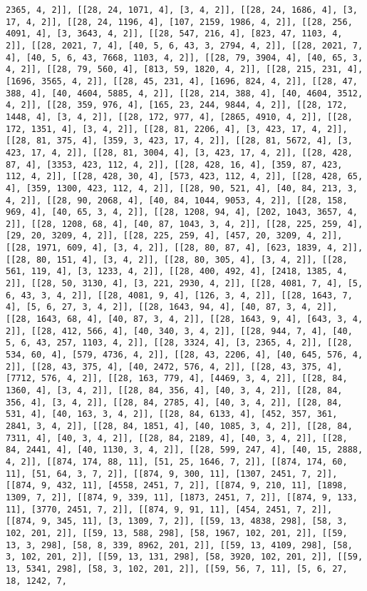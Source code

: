 \documentclass[12pt,fleqn]{article}\usepackage{../../common}
\begin{document}
\begin{verbatim}
2365, 4, 2]], [[28, 24, 1071, 4], [3, 4, 2]], [[28, 24, 1686, 4], [3, 17, 4, 2]], [[28, 24, 1196, 4], [107, 2159, 1986, 4, 2]], [[28, 256, 4091, 4], [3, 3643, 4, 2]], [[28, 547, 216, 4], [823, 47, 1103, 4, 2]], [[28, 2021, 7, 4], [40, 5, 6, 43, 3, 2794, 4, 2]], [[28, 2021, 7, 4], [40, 5, 6, 43, 7668, 1103, 4, 2]], [[28, 79, 3904, 4], [40, 65, 3, 4, 2]], [[28, 79, 560, 4], [813, 59, 1820, 4, 2]], [[28, 215, 231, 4], [1696, 3565, 4, 2]], [[28, 45, 231, 4], [1696, 824, 4, 2]], [[28, 47, 388, 4], [40, 4604, 5885, 4, 2]], [[28, 214, 388, 4], [40, 4604, 3512, 4, 2]], [[28, 359, 976, 4], [165, 23, 244, 9844, 4, 2]], [[28, 172, 1448, 4], [3, 4, 2]], [[28, 172, 977, 4], [2865, 4910, 4, 2]], [[28, 172, 1351, 4], [3, 4, 2]], [[28, 81, 2206, 4], [3, 423, 17, 4, 2]], [[28, 81, 375, 4], [359, 3, 423, 17, 4, 2]], [[28, 81, 5672, 4], [3, 423, 17, 4, 2]], [[28, 81, 3004, 4], [3, 423, 17, 4, 2]], [[28, 428, 87, 4], [3353, 423, 112, 4, 2]], [[28, 428, 16, 4], [359, 87, 423, 112, 4, 2]], [[28, 428, 30, 4], [573, 423, 112, 4, 2]], [[28, 428, 65, 4], [359, 1300, 423, 112, 4, 2]], [[28, 90, 521, 4], [40, 84, 213, 3, 4, 2]], [[28, 90, 2068, 4], [40, 84, 1044, 9053, 4, 2]], [[28, 158, 969, 4], [40, 65, 3, 4, 2]], [[28, 1208, 94, 4], [202, 1043, 3657, 4, 2]], [[28, 1208, 68, 4], [40, 87, 1043, 3, 4, 2]], [[28, 225, 259, 4], [29, 20, 3209, 4, 2]], [[28, 225, 259, 4], [457, 20, 3209, 4, 2]], [[28, 1971, 609, 4], [3, 4, 2]], [[28, 80, 87, 4], [623, 1839, 4, 2]], [[28, 80, 151, 4], [3, 4, 2]], [[28, 80, 305, 4], [3, 4, 2]], [[28, 561, 119, 4], [3, 1233, 4, 2]], [[28, 400, 492, 4], [2418, 1385, 4, 2]], [[28, 50, 3130, 4], [3, 221, 2930, 4, 2]], [[28, 4081, 7, 4], [5, 6, 43, 3, 4, 2]], [[28, 4081, 9, 4], [126, 3, 4, 2]], [[28, 1643, 7, 4], [5, 6, 27, 3, 4, 2]], [[28, 1643, 94, 4], [40, 87, 3, 4, 2]], [[28, 1643, 68, 4], [40, 87, 3, 4, 2]], [[28, 1643, 9, 4], [643, 3, 4, 2]], [[28, 412, 566, 4], [40, 340, 3, 4, 2]], [[28, 944, 7, 4], [40, 5, 6, 43, 257, 1103, 4, 2]], [[28, 3324, 4], [3, 2365, 4, 2]], [[28, 534, 60, 4], [579, 4736, 4, 2]], [[28, 43, 2206, 4], [40, 645, 576, 4, 2]], [[28, 43, 375, 4], [40, 2472, 576, 4, 2]], [[28, 43, 375, 4], [7712, 576, 4, 2]], [[28, 163, 779, 4], [4469, 3, 4, 2]], [[28, 84, 1360, 4], [3, 4, 2]], [[28, 84, 356, 4], [40, 3, 4, 2]], [[28, 84, 356, 4], [3, 4, 2]], [[28, 84, 2785, 4], [40, 3, 4, 2]], [[28, 84, 531, 4], [40, 163, 3, 4, 2]], [[28, 84, 6133, 4], [452, 357, 361, 2841, 3, 4, 2]], [[28, 84, 1851, 4], [40, 1085, 3, 4, 2]], [[28, 84, 7311, 4], [40, 3, 4, 2]], [[28, 84, 2189, 4], [40, 3, 4, 2]], [[28, 84, 2441, 4], [40, 1130, 3, 4, 2]], [[28, 599, 247, 4], [40, 15, 2888, 4, 2]], [[874, 174, 88, 11], [51, 25, 1646, 7, 2]], [[874, 174, 60, 11], [51, 64, 3, 7, 2]], [[874, 9, 300, 11], [1307, 2451, 7, 2]], [[874, 9, 432, 11], [4558, 2451, 7, 2]], [[874, 9, 210, 11], [1898, 1309, 7, 2]], [[874, 9, 339, 11], [1873, 2451, 7, 2]], [[874, 9, 133, 11], [3770, 2451, 7, 2]], [[874, 9, 91, 11], [454, 2451, 7, 2]], [[874, 9, 345, 11], [3, 1309, 7, 2]], [[59, 13, 4838, 298], [58, 3, 102, 201, 2]], [[59, 13, 588, 298], [58, 1967, 102, 201, 2]], [[59, 13, 3, 298], [58, 8, 339, 8962, 201, 2]], [[59, 13, 4109, 298], [58, 3, 102, 201, 2]], [[59, 13, 131, 298], [58, 3920, 102, 201, 2]], [[59, 13, 5341, 298], [58, 3, 102, 201, 2]], [[59, 56, 7, 11], [5, 6, 27, 18, 1242, 7, 
\end{verbatim}
\end{document}
